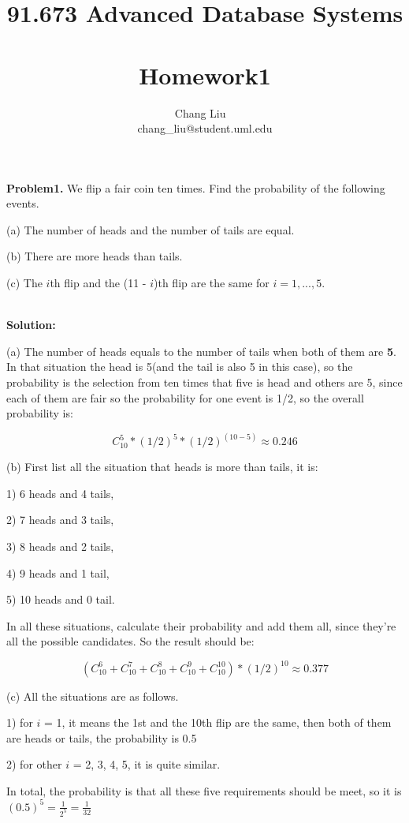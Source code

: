 \documentclass{article}
\author{Chang Liu ~\\ chang\_liu@student.uml.edu}
\title{91.673 Advanced Database Systems ~\\ Homework1}
\date{\datedate}
\begin{document}
\maketitle



\noindent \textbf{Problem1.} We flip a fair coin ten times. Find the probability of the following events.

(a) The number of heads and the number of tails are equal.

(b) There are more heads than tails.

(c) The $i$th flip and the (11 - $i$)th flip are the same for $i = 1, . . . , 5$.

~\\

\noindent \textbf{Solution:}

(a) The number of heads equals to the number of tails when both of them are \textbf{5}. In that situation the head is 5(and the tail is also 5 in this case), so the probability is the selection from ten times that five is head and others are 5, since each of them are fair so the probability for one event is 1/2, so the overall probability is:

$$C_{10}^5 * (1/2)^5 * (1/2)^{(10-5)} \approx 0.246$$

(b) First list all the situation that heads is more than tails, it is:

1) 6 heads and 4 tails,

2) 7 heads and 3 tails,

3) 8 heads and 2 tails,

4) 9 heads and 1 tail,

5) 10 heads and 0 tail.

In all these situations, calculate their probability and add them all, since they're all the possible candidates. So the result should be:

$$ (C_{10}^6 + C_{10}^7 + C_{10}^8 + C_{10}^9 + C_{10}^10) * (1/2)^{10} \approx 0.377$$


(c) All the situations are as follows.

1) for $i$ = 1, it means the 1st and the 10th flip are the same, then both of them are heads or tails, the probability is 0.5

2) for other $i$ = 2, 3, 4, 5, it is quite similar.

In total, the probability is that all these five requirements should be meet, so it is $(0.5)^5 = \frac{1}{2^5} = \frac{1}{32}$


~\\
\end{document}
